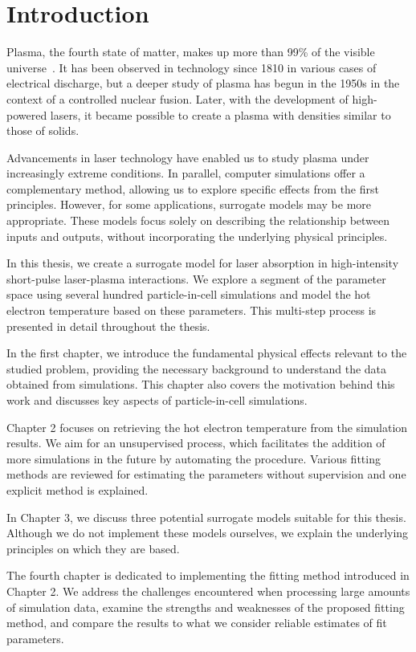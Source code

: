 \chapter*{Introduction}


Plasma, the fourth state of matter, makes up more than 99\% of the visible universe~\cite{plasma-intro}. It has been observed in technology since 1810 in various cases of electrical discharge, but a deeper study of plasma has begun in the 1950s in the context of a controlled nuclear fusion. Later, with the development of high-powered lasers, it became possible to create a plasma with densities similar to those of solids.

Advancements in laser technology have enabled us to study plasma under increasingly extreme conditions. In parallel, computer simulations offer a complementary method, allowing us to explore specific effects from the first principles. However, for some applications, surrogate models may be more appropriate. These models focus solely on describing the relationship between inputs and outputs, without incorporating the underlying physical principles.

In this thesis, we create a surrogate model for laser absorption in high-intensity short-pulse laser-plasma interactions. We explore a segment of the parameter space using several hundred particle-in-cell simulations and model the hot electron temperature based on these parameters. This multi-step process is presented in detail throughout the thesis.

In the first chapter, we introduce the fundamental physical effects relevant to the studied problem, providing the necessary background to understand the data obtained from simulations. This chapter also covers the motivation behind this work and discusses key aspects of particle-in-cell simulations.

Chapter 2 focuses on retrieving the hot electron temperature from the simulation results. We aim for an unsupervised process, which facilitates the addition of more simulations in the future by automating the procedure. Various fitting methods are reviewed for estimating the parameters without supervision and one explicit method is explained.

In Chapter 3, we discuss three potential surrogate models suitable for this thesis. Although we do not implement these models ourselves, we explain the underlying principles on which they are based.

The fourth chapter is dedicated to implementing the fitting method introduced in Chapter 2. We address the challenges encountered when processing large amounts of simulation data, examine the strengths and weaknesses of the proposed fitting method, and compare the results to what we consider reliable estimates of fit parameters.

